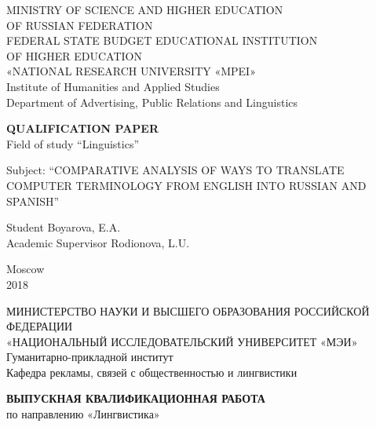 \documentclass[12pt, a4paper, twoside]{report}
\begin{document}
\begin{center}
MINISTRY OF SCIENCE AND HIGHER EDUCATION\\
OF RUSSIAN FEDERATION\\
\setlength{\parskip}{0.3 cm}
FEDERAL STATE BUDGET EDUCATIONAL INSTITUTION\\
OF HIGHER EDUCATION\\
\setlength{\parskip}{0.6 cm}
«NATIONAL RESEARCH UNIVERSITY «MPEI»\\
\setlength{\parskip}{0.8 cm}
Institute of Humanities and Applied Studies\\
Department of Advertising, Public Relations and Linguistics\\
\end{center}

\begin{center}
\setlength{\parskip}{2 cm}
\textbf{QUALIFICATION PAPER}\\
Field of study “Linguistics”
\end{center}

\begin{center}
\setlength{\parskip}{2 cm}
Subject: “COMPARATIVE ANALYSIS OF WAYS TO TRANSLATE COMPUTER TERMINOLOGY FROM ENGLISH INTO RUSSIAN AND SPANISH”
\end{center}

\begin{flushright}
\setlength{\parskip}{4.5 cm}
Student Boyarova, E.A. \\
Academic Supervisor Rodionova, L.U.  
\end{flushright}


\begin{center}
\setlength{\parskip}{2 cm}
Moscow\\
2018
\end{center}
\thispagestyle{empty}

\newpage
\begin{center}
МИНИСТЕРСТВО НАУКИ И ВЫСШЕГО ОБРАЗОВАНИЯ РОССИЙСКОЙ ФЕДЕРАЦИИ\\
\setlength{\parskip}{0.3 cm}
«НАЦИОНАЛЬНЫЙ ИССЛЕДОВАТЕЛЬСКИЙ УНИВЕРСИТЕТ «МЭИ»\\
\setlength{\parskip}{0.6 cm}
Гуманитарно-прикладной институт\\
Кафедра рекламы, связей с общественностью и лингвистики\\
\end{center}

\begin{center}
\setlength{\parskip}{2 cm}
\textbf{ВЫПУСКНАЯ КВАЛИФИКАЦИОННАЯ РАБОТА}\\
по направлению «Лингвистика»
\end{center}
\end{document}
